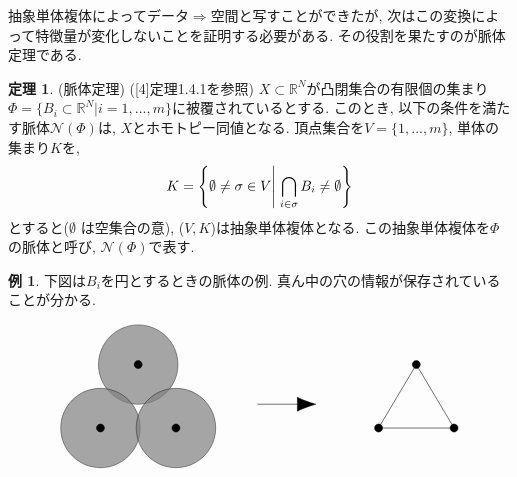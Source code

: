 \documentclass[a4paper]{jsarticle}
\theoremstyle{definition}
\newtheorem{thm}[dfn]{定理}
\newtheorem{exam}[dfn]{例}
\begin{document}
抽象単体複体によってデータ$\Rightarrow$空間と写すことができたが, 次はこの変換によって特徴量が変化しないことを証明する必要がある. その役割を果たすのが脈体定理である.
 
\begin{thm}
    (脈体定理) ([4]定理1.4.1を参照) $X\subset \mathbb{R}^N$が凸閉集合の有限個の集まり$\Phi=\{B_i\subset \mathbb{R}^N| i=1,...,m\}$に被覆されているとする. このとき, 以下の条件を満たす脈体$\mathcal{N}(\Phi)$は, $X$とホモトピー同値となる. 頂点集合を$V=\{1,...,m\}$, 単体の集まり$K$を, 
\begin{equation}
   K = \left\{ \emptyset\neq\sigma\in V \middle| \; \bigcap_{i\in\sigma}^{}B_{i} \neq \emptyset \right\} 
 \notag
 \end{equation}
とすると($\emptyset$ は空集合の意), ($V,K$)は抽象単体複体となる. この抽象単体複体を$\Phi$の脈体と呼び, $\mathcal{N}(\Phi)$で表す.
\end{thm}

\begin{exam}下図は$B_i$を円とするときの脈体の例. 真ん中の穴の情報が保存されていることが分かる.
\end{exam}
\begin{equation}
\begin{tikzpicture}
\filldraw[fill=gray, draw=black, opacity=0.7] (-4,0) circle (1);
\filldraw[fill=gray, draw=black, opacity=0.7] (-4.95,-1.6) circle (1);
\filldraw[fill=gray, draw=black, opacity=0.7] (-3.05,-1.6) circle (1);
\filldraw[fill=black, draw=black] (-4,0) circle (0.1);
\filldraw[fill=black, draw=black] (-4.95,-1.6) circle (0.1);
\filldraw[fill=black, draw=black] (-3.05,-1.6) circle (0.1);
\draw [-{Latex[length=5mm]}]  (-1,-1) -- (0.5,-1);
\filldraw[fill=black, draw=black] (3,0) circle (0.1);
\filldraw[fill=black, draw=black] (3.95,-1.6) circle (0.1);
\filldraw[fill=black, draw=black] (2.05,-1.6) circle (0.1);
\draw (3.95, -1.6) -- (2.05, -1.6);
\draw (3.95, -1.6) -- (3, 0);
\draw (3, 0) -- (2.05, -1.6);
\end{tikzpicture}
\notag    
\end{equation}
\end{document}
